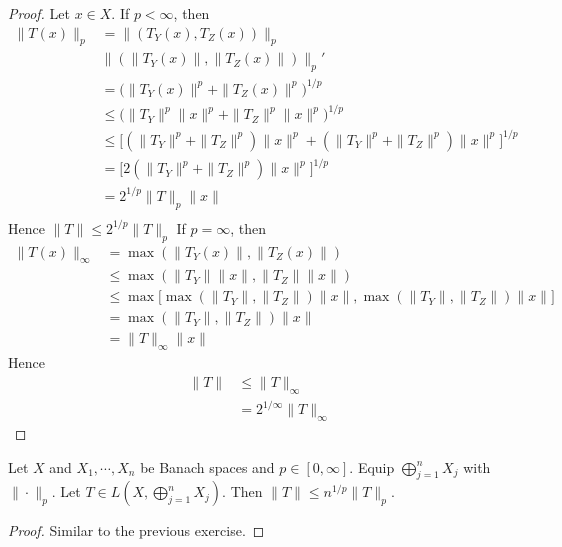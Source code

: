 \documentclass{book}
\begin{document}
	\begin{proof}
	Let $x \in X$. If $p < \infty$, then
	\begin{align*}
	\|T(x)\|_p
	&= \|(T_Y(x), T_Z(x))\|_p \\
	& \|( \|T_Y(x)\|, \|T_Z(x)\|)\|_p' \\
	&=  \bigg(\|T_Y(x) \|^p +  \|T_Z(x) \|^p \bigg)^{1/p} \\
	& \leq \bigg(\|T_Y\|^p\|x\|^p +  \|T_Z\|^p\|x\|^p \bigg)^{1/p} \\
	& \leq \bigg[ (\|T_Y\|^p+ \|T_Z\|^p)\|x\|^p +  (\|T_Y\|^p + \|T_Z\|^p)\|x\|^p \bigg ]^{1/p} \\
	&= \bigg[ 2(\|T_Y\|^p + \|T_Z\|^p)\|x\|^p \bigg ]^{1/p} \\
	&= 2^{1/p}\|T\|_p\|x\| \\
	\end{align*}
	Hence $\|T\| \leq 2^{1/p}\|T\|_p$
	If $p = \infty$, then 
	\begin{align*}
	\|T(x)\|_{\infty} 
	&= \max(\|T_Y(x) \|, \|T_Z(x)\|) \\
	& \leq \max(\|T_Y\|\|x \|, \|T_Z\|\|x\|) \\
	& \leq \max \bigg[ \max (\|T_Y\|, \|T_Z\|)\|x \|, \max(\|T_Y\| ,\|T_Z\|)\|x\| \bigg] \\
	&= \max(\|T_Y\| ,\|T_Z\|) \|x\|\\
	&= \|T\|_{\infty} \|x\|
	\end{align*}
	Hence 
	\begin{align*}
	\|T\| 
	& \leq \|T\|_{\infty} \\
	&= 2^{1/\infty}\|T\|_{\infty}
	\end{align*}
	\end{proof}
	
	\begin{ex}
	Let $X$ and $X_1, \cdots, X_n$ be Banach spaces and $p \in [0, \infty]$. Equip $\bigoplus\limits_{j=1}^n X_j$ with $\|\cdot\|_p$. Let $T \in L(X, \bigoplus\limits_{j=1}^n X_j)$. Then $\|T\|\leq n^{1/p}\|T\|_p$.
	\end{ex}
	
	\begin{proof}
	Similar to the previous exercise.
	\end{proof}
	
	
	
	
	
	
	
	
	
	
	
	
	
	
	
\end{document}

